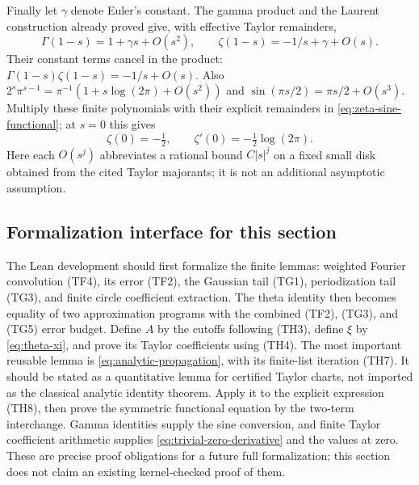 Finally let $\gamma$ denote Euler's constant.  The gamma product
and the Laurent construction already proved give, with effective
Taylor remainders,
\[
 \Gamma(1-s)=1+\gamma s+O(s^2),\qquad
 \zeta(1-s)=-1/s+\gamma+O(s).
\]
Their constant terms cancel in the product:
$\Gamma(1-s)\zeta(1-s)=-1/s+O(s)$.
Also
$2^s\pi^{s-1}=\pi^{-1}(1+s\log(2\pi)+O(s^2))$ and
$\sin(\pi s/2)=\pi s/2+O(s^3)$.  Multiply these finite
polynomials with their explicit remainders in
\eqref{eq:zeta-sine-functional}; at $s=0$ this gives
\[
 \boxed{\zeta(0)=-\tfrac12,\qquad
             \zeta'(0)=-\tfrac12\log(2\pi).}
\]
Here each $O(s^j)$ abbreviates a rational bound $C|s|^j$ on a fixed
small disk obtained from the cited Taylor majorants; it is not an
additional asymptotic assumption.

\subsection{Formalization interface for this section}

The Lean development should first formalize the finite lemmas:
weighted Fourier convolution (TF4), its error (TF2), the Gaussian tail
(TG1), periodization tail (TG3), and finite circle coefficient extraction.
The theta identity then becomes equality of two approximation programs
with the combined (TF2), (TG3), and (TG5) error budget.  Define $A$ by the
cutoffs following (TH3), define $\xi$ by
\eqref{eq:theta-xi}, and prove its Taylor coefficients using (TH4).
The most important reusable lemma is
\eqref{eq:analytic-propagation}, with its finite-list iteration (TH7).
It should be stated as a quantitative lemma for certified Taylor
charts, not imported as the classical analytic identity theorem.
Apply it to the explicit expression (TH8), then prove the symmetric
functional equation by the two-term interchange.  Gamma identities
supply the sine conversion, and finite Taylor coefficient arithmetic
supplies \eqref{eq:trivial-zero-derivative} and the values at zero.
These are precise proof obligations for a future full formalization;
this section does not claim an existing kernel-checked proof of them.
